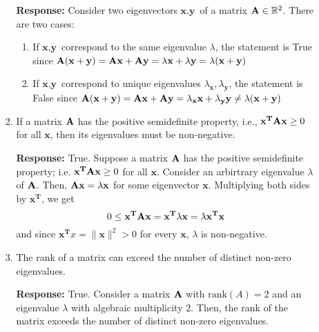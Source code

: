 \documentclass [12pt] {article}
\newcommand{\R}{\mathbb{R}}
\newcommand{\T}{\bf{T}}
\newcommand{\x}{\bf{x}}
\renewcommand{\bf}[1]{\textbf{{#1}}}
\begin{document}
\begin{enumerate}
\begin{enumerate}
\begin{enumerate}
                        \bf{Response:} Consider two eigenvectors $\bf{x}, \bf{y}$ of a matrix
                        $\A \in \R^2$. There are two cases:
                        \begin{enumerate}[label=\textit{Case \arabic*:},leftmargin=*]
                            \item If $\bf{x}, \bf{y}$ correspond to the same eigenvalue $\lambda$, 
                                the statement is True since 
                                $\A(\bf{x} + \bf{y}) = \A \bf{x} + \A \bf{y} = \lambda \bf{x} + \lambda \bf{y} = \lambda(\bf{x} + \bf{y})$
                            \item If $\bf{x}, \bf{y}$ correspond to unique eigenvalues 
                                $\lambda_{\bf{x}}, \lambda_{\bf{y}}$, the statement is False since
                                $\A(\bf{x} + \bf{y}) = \A \bf{x} + \A \bf{y} = \lambda_{\bf{x}} \bf{x} + \lambda_{\bf{y}} \bf{y} \neq \lambda(\bf{x} + \bf{y})$
                        \end{enumerate}

                    \item If a matrix $\A$ has the positive semidefinite property, i.e., 
                        $\x^{\T} \A \x \geq 0$ for all $\x$, then its eigenvalues must be
                        non-negative. \vspace{10pt}

                        \bf{Response:} True. Suppose a matrix $\A$ has the positive semidefinite
                        property; i.e. $\x^{\T} \A \x \geq 0$ for all $\x$. Consider an arbirtrary
                        eigenvalue $\lambda$ of $\A$. Then, $\A \x = \lambda \x$ for some eigenvector
                        $\x$. Multiplying both sides by $\x^{\T}$, we get 
                        \[0 \leq \x^{\T} \A \x = \x^{\T} \lambda \x = \lambda \x^{\T} \x\]
                        and since $\x^{\T}x = \|\x\|^2 > 0$ for every $\x$, $\lambda$ is non-negative.

                    \item The rank of a matrix can exceed the number of distinct non-zero 
                        eigenvalues. \vspace{10pt}

                        \bf{Response:} True. Consider a matrix $\A$ with $\text{rank}(A) = 2$ and 
                        an eigenvalue $\lambda$ with algebraic multiplicity $2$. Then, the rank of
                        the matrix exceeds the number of distinct non-zero eigenvalues.


\end{enumerate}
\end{enumerate}
\end{enumerate}
\end{document}
